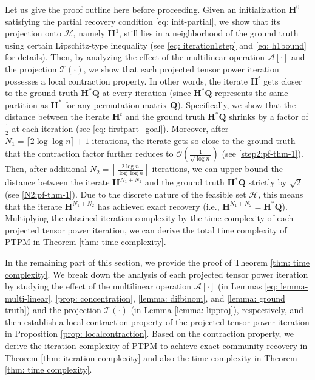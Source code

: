 \documentclass{article}
\theoremstyle{plain}
\theoremstyle{definition}
\theoremstyle{remark}
\begin{document}
Let us give the proof outline here before proceeding. Given an initialization $\bm{H}^0$ satisfying the partial recovery condition \eqref{eq: init-partial}, we show that its projection onto $\mathcal{H}$, namely $\bm{H}^1$, still lies in a neighborhood of the ground truth using certain Lipschitz-type inequality (see \eqref{eq: iteration1step} and \eqref{eq: h1bound} for details). Then, by analyzing the effect of the multilinear operation $\mathcal{A}[\cdot]$ and the projection $\mathcal{T}(\cdot)$, we show that each projected tensor power iteration possesses a local contraction property. In other words, the iterate $\bm{H}^t$ gets closer to the ground truth $\bm{H}^*\bm{Q}$ at every iteration (since $\bm{H}^*\bm{Q}$ represents the same partition as $\bm{H}^*$ for any permutation matrix $\bm{Q}$). Specifically, we show that the distance between the iterate $\bm{H}^t$ and the ground truth $\bm{H}^*\bm{Q}$ shrinks by a factor of $\frac{1}{2}$ at each iteration (see \eqref{eq: firstpart_goal}). Moreover, after $N_1 = \lceil 2\log\log n \rceil + 1$ iterations, the iterate gets so close to the ground truth that the contraction factor further reduces to $\mathcal{O}\left(\frac{1}{\sqrt{\log n}}\right)$ (see \eqref{step2:pf-thm-1}). Then, after additional $N_2 = \left\lceil \frac{2\log n}{\log\log n} \right\rceil$ iterations, we can upper bound the distance between the iterate $\bm{H}^{N_1 + N_2}$ and the ground truth $\bm{H}^*\bm{Q}$ strictly by $\sqrt{2}$ (see \eqref{N2:pf-thm-1}). Due to the discrete nature of the feasible set $\mathcal{H}$, this means that the iterate $\bm{H}^{N_1 + N_2}$ has achieved exact recovery (i.e., $\bm{H}^{N_1 + N_2} = \bm{H}^*\bm{Q}$). Multiplying the obtained iteration complexity by the time complexity of each projected tensor power iteration, we can derive the total time complexity of PTPM in Theorem \ref{thm: time complexity}.

In the remaining part of this section, we provide the proof of Theorem \ref{thm: time complexity}. We break down the analysis of each projected tensor power iteration by studying the effect of the multilinear operation $\mathcal{A}[\cdot]$ (in Lemmas \ref{eq: lemma-multi-linear}, \ref{prop: concentration}, \ref{lemma: difbinom}, and \ref{lemma: ground truth}) and the projection $\mathcal{T}(\cdot)$ (in Lemma \ref{lemma: lipproj}), respectively, and then establish a local contraction property of the projected tensor power iteration in Proposition \ref{prop: localcontraction}. Based on the contraction property, we derive the iteration complexity of PTPM to achieve exact community recovery in Theorem \ref{thm: iteration complexity} and also the time complexity in Theorem \ref{thm: time complexity}.
\end{document}
